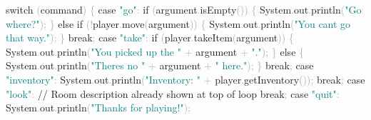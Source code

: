 \documentclass[
  justified,
  openright,
]{tufte-book}
\newcommand{\BuiltInTok}[1]{#1}
\newcommand{\CommentTok}[1]{\textcolor{MidGray}{#1}}
\newcommand{\ControlFlowTok}[1]{\textcolor{BrandBlue}{#1}}
\newcommand{\FunctionTok}[1]{\textcolor{BrandBlue}{#1}}
\newcommand{\NormalTok}[1]{#1}
\newcommand{\OperatorTok}[1]{\textcolor{DarkGray}{#1}}
\newcommand{\StringTok}[1]{\textcolor{Teal}{#1}}
\newenvironment{Shaded}{%
  \begin{snugshade}
}{%
  \end{snugshade}
}
\begin{document}
\begin{Shaded}
\begin{Highlighting}[]
            \ControlFlowTok{switch} \OperatorTok{(}\NormalTok{command}\OperatorTok{)} \OperatorTok{\{}
                \ControlFlowTok{case} \StringTok{"go"}\OperatorTok{:}
                    \ControlFlowTok{if} \OperatorTok{(}\NormalTok{argument}\OperatorTok{.}\FunctionTok{isEmpty}\OperatorTok{())} \OperatorTok{\{}
                        \BuiltInTok{System}\OperatorTok{.}\FunctionTok{out}\OperatorTok{.}\FunctionTok{println}\OperatorTok{(}\StringTok{"Go where?"}\OperatorTok{);}
                    \OperatorTok{\}} \ControlFlowTok{else} \ControlFlowTok{if} \OperatorTok{(!}\NormalTok{player}\OperatorTok{.}\FunctionTok{move}\OperatorTok{(}\NormalTok{argument}\OperatorTok{))} \OperatorTok{\{}
                        \BuiltInTok{System}\OperatorTok{.}\FunctionTok{out}\OperatorTok{.}\FunctionTok{println}\OperatorTok{(}\StringTok{"You can\textquotesingle{}t go that way."}\OperatorTok{);}
                    \OperatorTok{\}}
                    \ControlFlowTok{break}\OperatorTok{;}
                \ControlFlowTok{case} \StringTok{"take"}\OperatorTok{:}
                    \ControlFlowTok{if} \OperatorTok{(}\NormalTok{player}\OperatorTok{.}\FunctionTok{takeItem}\OperatorTok{(}\NormalTok{argument}\OperatorTok{))} \OperatorTok{\{}
                        \BuiltInTok{System}\OperatorTok{.}\FunctionTok{out}\OperatorTok{.}\FunctionTok{println}\OperatorTok{(}\StringTok{"You picked up the "} \OperatorTok{+}\NormalTok{ argument }\OperatorTok{+} \StringTok{"."}\OperatorTok{);}
                    \OperatorTok{\}} \ControlFlowTok{else} \OperatorTok{\{}
                        \BuiltInTok{System}\OperatorTok{.}\FunctionTok{out}\OperatorTok{.}\FunctionTok{println}\OperatorTok{(}\StringTok{"There\textquotesingle{}s no "} \OperatorTok{+}\NormalTok{ argument }\OperatorTok{+} \StringTok{" here."}\OperatorTok{);}
                    \OperatorTok{\}}
                    \ControlFlowTok{break}\OperatorTok{;}
                \ControlFlowTok{case} \StringTok{"inventory"}\OperatorTok{:}
                    \BuiltInTok{System}\OperatorTok{.}\FunctionTok{out}\OperatorTok{.}\FunctionTok{println}\OperatorTok{(}\StringTok{"Inventory: "} \OperatorTok{+}\NormalTok{ player}\OperatorTok{.}\FunctionTok{getInventory}\OperatorTok{());}
                    \ControlFlowTok{break}\OperatorTok{;}
                \ControlFlowTok{case} \StringTok{"look"}\OperatorTok{:}
                    \CommentTok{// Room description already shown at top of loop}
                    \ControlFlowTok{break}\OperatorTok{;}
                \ControlFlowTok{case} \StringTok{"quit"}\OperatorTok{:}
                    \BuiltInTok{System}\OperatorTok{.}\FunctionTok{out}\OperatorTok{.}\FunctionTok{println}\OperatorTok{(}\StringTok{"Thanks for playing!"}\OperatorTok{);}

\end{Highlighting}
\end{Shaded}
\end{document}

